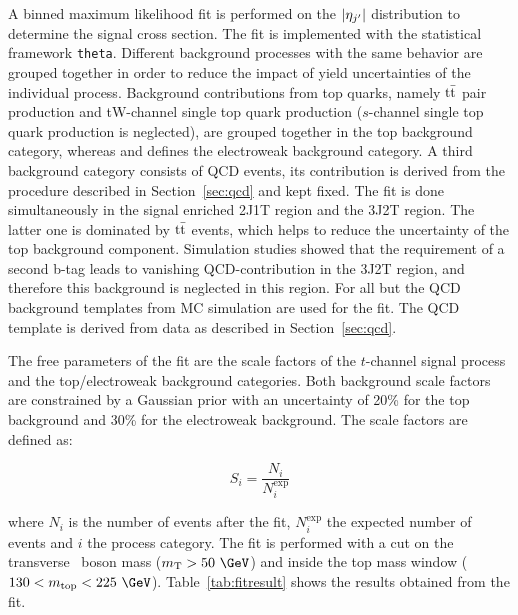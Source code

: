 A binned maximum likelihood fit is performed on the $|\eta_{j^\prime}|$ distribution to determine the signal cross section. The fit is implemented with the statistical framework \texttt{theta}. Different background processes with the same behavior are grouped together in order to reduce the impact of yield uncertainties of the individual process. Background contributions from top quarks, namely $\mathrm{t}\bar{\mathrm{t}}$ pair production and tW-channel single top quark production ($s$-channel single top quark production is neglected), are grouped together in the top background category, whereas \wjets and \zjets defines the electroweak background category. A third background category consists of QCD events, its contribution is derived from the procedure described in Section~\ref{sec:qcd} and kept fixed. The fit is done simultaneously in the signal enriched 2J1T region and the 3J2T region. The latter one is dominated by $\mathrm{t}\bar{\mathrm{t}}$ events, which helps to reduce the uncertainty of the top background component. Simulation studies showed that the requirement of a second b-tag leads to vanishing QCD-contribution in the 3J2T region, and therefore this background is neglected in this region. For all but the QCD background templates from MC simulation are used for the fit. The QCD template is derived from data as described in Section~\ref{sec:qcd}.


The free parameters of the fit are the scale factors of the $t$-channel signal process and the top/electroweak background categories. Both background scale factors are constrained by a Gaussian prior with an uncertainty of 20\% for the top background and 30\% for the electroweak background. The scale factors are defined as:

\begin{equation}
S_i = \frac{N_i}{N_i ^{\text{exp}}}
\label{eq:scalef}
\end{equation}

where $N_i$ is the number of events after the fit, $N_i ^{\text{exp}}$ the expected number of events and $i$ the process category. The fit is performed with a cut on the transverse \PW~boson mass ($\mtw > 50~\GeV$) and inside the top mass window ($130 < m_{\text{top}} < 225~\GeV$). Table~\ref{tab:fitresult} shows the results obtained from the fit.

